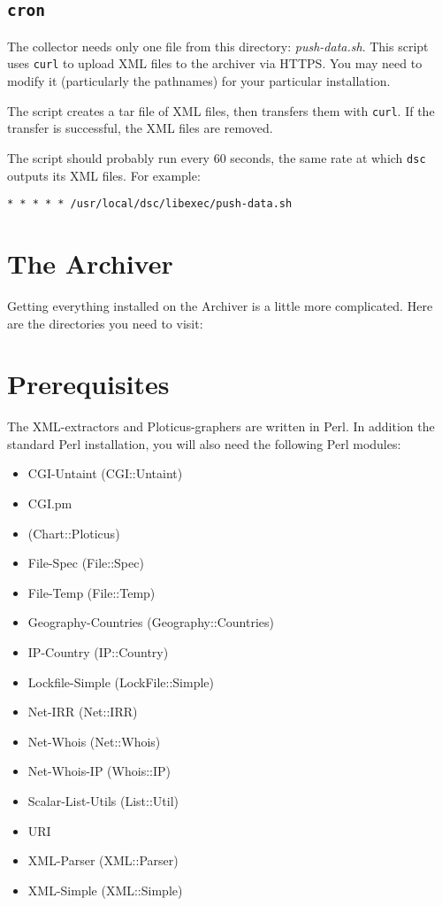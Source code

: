 \documentclass{report}
\begin{document}
\subsection{\tt cron}
\label{sec-install-collector-cron}

The collector needs only one file from this directory: {\em
push-data.sh\/}.  This script uses {\tt curl\/} to upload XML files
to the archiver via HTTPS.  You may need to modify it (particularly
the pathnames) for your particular installation.

The script creates a tar file of XML files, then transfers them
with {\tt curl\/}.  If the transfer is successful, the XML files
are removed.

The script should probably run every 60 seconds, the same rate at
which {\tt dsc\/} outputs its XML files.  For example:

\begin{verbatim}
* * * * * /usr/local/dsc/libexec/push-data.sh
\end{verbatim}

\section{The Archiver}

Getting everything installed on the Archiver is a little more complicated.
Here are the directories you need to visit:

\section{Prerequisites}

The XML-extractors and Ploticus-graphers are written in Perl.  In addition the
standard Perl installation, you will also need the following Perl modules:

\begin{itemize}
	\item CGI-Untaint (CGI::Untaint)
	\item CGI.pm
	\item (Chart::Ploticus)
	\item File-Spec (File::Spec)
	\item File-Temp (File::Temp)
	\item Geography-Countries (Geography::Countries)
	\item IP-Country (IP::Country)
	\item Lockfile-Simple (LockFile::Simple)
	\item Net-IRR (Net::IRR)
	\item Net-Whois (Net::Whois)
	\item Net-Whois-IP (Whois::IP)
	\item Scalar-List-Utils (List::Util)
	\item URI
	\item XML-Parser (XML::Parser)
	\item XML-Simple (XML::Simple)
\end{itemize}
\end{document}
